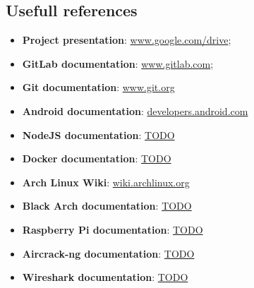 \documentclass[../PiTest.tex]{subfiles}
\begin{document}
	\subsection{Usefull references}
		\begin{itemize}
			\item\textbf{Project presentation}: \url{www.google.com/drive}; %
			\item\textbf{GitLab documentation}: \url{www.gitlab.com}; %
			\item\textbf{Git documentation}: \url{www.git.org} %
			\item\textbf{Android documentation}: \url{developers.android.com} %
			\item\textbf{NodeJS documentation}: \url{TODO} %
			\item\textbf{Docker documentation}: \url{TODO}%
			\item\textbf{Arch Linux Wiki}: \url{wiki.archlinux.org} %
			\item\textbf{Black Arch documentation}: \url{TODO} %
			\item\textbf{Raspberry Pi documentation}: \url{TODO} %
			\item\textbf{Aircrack-ng documentation}: \url{TODO} %
			\item\textbf{Wireshark documentation}: \url{TODO} %
		\end{itemize}
			
\end{document}
